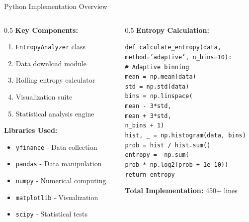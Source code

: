 \documentclass[aspectratio=169,12pt,xcolor=table]{beamer}
\begin{document}
\begin{frame}[fragile]{Python Implementation Overview}
\begin{columns}[T]
\begin{column}{0.5\textwidth}
    \textbf{Key Components:}
    \begin{enumerate}
        \item \texttt{EntropyAnalyzer} class
        \item Data download module
        \item Rolling entropy calculator
        \item Visualization suite
        \item Statistical analysis engine
    \end{enumerate}
    
    \textbf{Libraries Used:}
    \begin{itemize}
        \item \texttt{yfinance} - Data collection
        \item \texttt{pandas} - Data manipulation
        \item \texttt{numpy} - Numerical computing
        \item \texttt{matplotlib} - Visualization
        \item \texttt{scipy} - Statistical tests
    \end{itemize}
\end{column}

\begin{column}{0.5\textwidth}
    \textbf{Entropy Calculation:}
    \begin{block}{}
        \tiny
        \texttt{def calculate\_entropy(data, \\
        \quad method='adaptive', n\_bins=10): \\
        \quad\quad \# Adaptive binning \\
        \quad\quad mean = np.mean(data) \\
        \quad\quad std = np.std(data) \\
        \quad\quad bins = np.linspace( \\
        \quad\quad\quad mean - 3*std, \\
        \quad\quad\quad mean + 3*std, \\
        \quad\quad\quad n\_bins + 1) \\
        \quad\quad hist, \_ = np.histogram(data, bins) \\
        \quad\quad prob = hist / hist.sum() \\
        \quad\quad entropy = -np.sum( \\
        \quad\quad\quad prob * np.log2(prob + 1e-10)) \\
        \quad\quad return entropy}
    \end{block}
    
    \vspace{0.2cm}
    \textbf{Total Implementation:} 450+ lines
\end{column}
\end{columns}
\end{frame}
\end{document}
